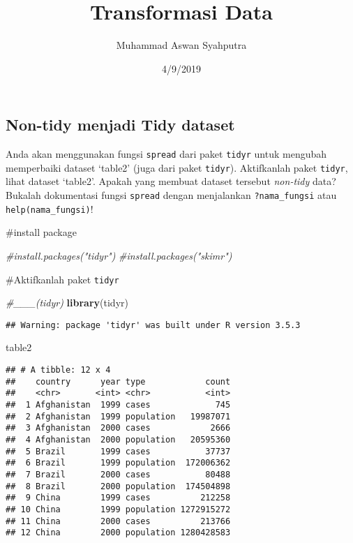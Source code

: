 \documentclass[]{article}
\title{Transformasi Data}
\author{Muhammad Aswan Syahputra}
\date{4/9/2019}
\newenvironment{Shaded}{\begin{snugshade}}{\end{snugshade}}
\newcommand{\CommentTok}[1]{\textcolor[rgb]{0.56,0.35,0.01}{\textit{#1}}}
\newcommand{\KeywordTok}[1]{\textcolor[rgb]{0.13,0.29,0.53}{\textbf{#1}}}
\newcommand{\NormalTok}[1]{#1}
\begin{document}
\maketitle

{
\setcounter{tocdepth}{2}
\tableofcontents
}
\hypertarget{non-tidy-menjadi-tidy-dataset}{%
\subsection{Non-tidy menjadi Tidy
dataset}\label{non-tidy-menjadi-tidy-dataset}}

Anda akan menggunakan fungsi \texttt{spread} dari paket \texttt{tidyr}
untuk mengubah memperbaiki dataset `table2' (juga dari paket
\texttt{tidyr}). Aktifkanlah paket \texttt{tidyr}, lihat dataset
`table2'. Apakah yang membuat dataset tersebut \emph{non-tidy} data?
Bukalah dokumentasi fungsi \texttt{spread} dengan menjalankan
\texttt{?nama\_fungsi} atau \texttt{help(nama\_fungsi)}!

\#install package

\begin{Shaded}
\begin{Highlighting}[]
\CommentTok{#install.packages("tidyr")}
\CommentTok{#install.packages("skimr")}
\end{Highlighting}
\end{Shaded}

\#Aktifkanlah paket \texttt{tidyr}

\begin{Shaded}
\begin{Highlighting}[]
\CommentTok{#___(tidyr)}
\KeywordTok{library}\NormalTok{(tidyr)}
\end{Highlighting}
\end{Shaded}

\begin{verbatim}
## Warning: package 'tidyr' was built under R version 3.5.3
\end{verbatim}

\begin{Shaded}
\begin{Highlighting}[]
\NormalTok{table2}
\end{Highlighting}
\end{Shaded}

\begin{verbatim}
## # A tibble: 12 x 4
##    country      year type            count
##    <chr>       <int> <chr>           <int>
##  1 Afghanistan  1999 cases             745
##  2 Afghanistan  1999 population   19987071
##  3 Afghanistan  2000 cases            2666
##  4 Afghanistan  2000 population   20595360
##  5 Brazil       1999 cases           37737
##  6 Brazil       1999 population  172006362
##  7 Brazil       2000 cases           80488
##  8 Brazil       2000 population  174504898
##  9 China        1999 cases          212258
## 10 China        1999 population 1272915272
## 11 China        2000 cases          213766
## 12 China        2000 population 1280428583
\end{verbatim}
\end{document}
